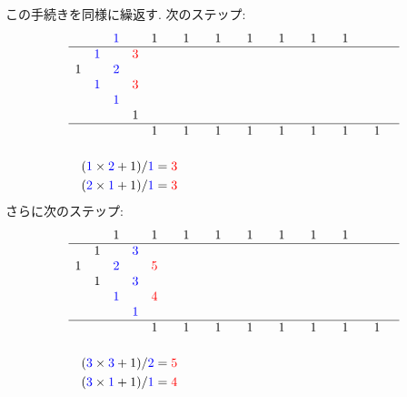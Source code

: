 \documentclass[12pt,twoside,dvipdfm]{jarticle}
\newcommand\red{\color{red}}
\newcommand\blue{\color{blue}}
\renewcommand\r{\red}
\renewcommand\b{\blue}
\theoremstyle{definition} %
\theoremstyle{definition} %
\theoremstyle{definition} %
\numberwithin{theorem}{section}
\numberwithin{equation}{section}
\numberwithin{figure}{section}
\numberwithin{table}{section}
\begin{document}
この手続きを同様に繰返す. 次のステップ:
\begin{align*}
&
\begin{array}{cccccccccccccccccccc}
    &   &\b1&   & 1 &   & 1 &   & 1 &   & 1 &   & 1 &   & 1 &   & 1 &   &   &   \\ \hline
    &\b1&   &\r3&   &   &   &   &   &   &   &   &   &   &   &   &   &   &   &   \\
  1 &   &\b2&   &   &   &   &   &   &   &   &   &   &   &   &   &   &   &   &   \\
    &\b1&   &\r3&   &   &   &   &   &   &   &   &   &   &   &   &   &   &   &   \\
    &   &\b1&   &   &   &   &   &   &   &   &   &   &   &   &   &   &   &   &   \\
    &   &   & 1 &   &   &   &   &   &   &   &   &   &   &   &   &   &   &   &   \\ \hline
    &   &   &   & 1 &   & 1 &   & 1 &   & 1 &   & 1 &   & 1 &   & 1 &   & 1 &   \\
\end{array}
\\[\bigskipamount] & \quad
({\b1}\times{\b2}+1)/{\b1}={\r3}
\\ & \quad
({\b2}\times{\b1}+1)/{\b1}={\r3}
\end{align*} 
さらに次のステップ:
\begin{align*}
&
\begin{array}{cccccccccccccccccccc}
    &   & 1 &   & 1 &   & 1 &   & 1 &   & 1 &   & 1 &   & 1 &   & 1 &   &   &   \\ \hline
    & 1 &   &\b3&   &   &   &   &   &   &   &   &   &   &   &   &   &   &   &   \\
  1 &   &\b2&   &\r5&   &   &   &   &   &   &   &   &   &   &   &   &   &   &   \\
    & 1 &   &\b3&   &   &   &   &   &   &   &   &   &   &   &   &   &   &   &   \\
    &   &\b1&   &\r4&   &   &   &   &   &   &   &   &   &   &   &   &   &   &   \\
    &   &   &\b1&   &   &   &   &   &   &   &   &   &   &   &   &   &   &   &   \\ \hline
    &   &   &   & 1 &   & 1 &   & 1 &   & 1 &   & 1 &   & 1 &   & 1 &   & 1 &   \\
\end{array}
\\[\bigskipamount] & \quad
({\b3}\times{\b3}+1)/{\b2}={\r5}
\\ & \quad
({\b3}\times{\b1}+1)/{\b1}={\r4}
\\ & \quad
\phantom{({\b2}\times{\b1}+1)/{\b1}={\r3}}
\end{align*}
\end{document}
